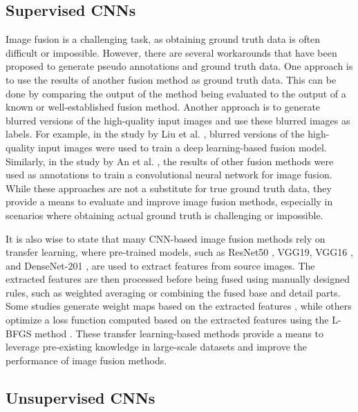 \subsection{Supervised CNNs}
\label{subsec:supervised}

Image fusion is a challenging task, as obtaining ground truth data is often difficult or impossible. However, there are several workarounds that have been proposed to generate pseudo annotations and ground truth data. One approach is to use the results of another fusion method as ground truth data. This can be done by comparing the output of the method being evaluated to the output of a known or well-established fusion method. Another approach is to generate blurred versions of the high-quality input images and use these blurred images as labels. For example, in the study by Liu et al. \cite{liu2018infrared}, blurred versions of the high-quality input images were used to train a deep learning-based fusion model. Similarly, in the study by An et al. \cite{an2020infrared}, the results of other fusion methods were used as annotations to train a convolutional neural network for image fusion. While these approaches are not a substitute for true ground truth data, they provide a means to evaluate and improve image fusion methods, especially in scenarios where obtaining actual ground truth is challenging or impossible.

It is also wise to state that many CNN-based image fusion methods rely on transfer learning, where pre-trained models, such as ResNet50 \cite{li2019infrared,li2021infrared}, VGG19\cite{li2018infrared,ren2018infrared}, VGG16 \cite{yang2021vmdm}, and DenseNet-201 \cite{li2020unsupervised}, are used to extract features from source images. The extracted features are then processed before being fused using manually designed rules, such as weighted averaging or combining the fused base and detail parts. Some studies generate weight maps based on the extracted features \cite{li2019infrared,li2020unsupervised,yang2021vmdm}, while others optimize a loss function computed based on the extracted features using the L-BFGS method \cite{ren2018infrared}. These transfer learning-based methods provide a means to leverage pre-existing knowledge in large-scale datasets and improve the performance of image fusion methods.

\subsection{Unsupervised CNNs}
\label{subsec:unsupervised}

